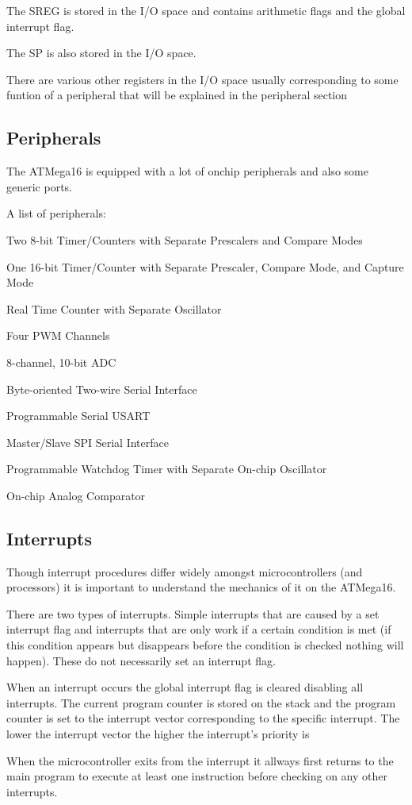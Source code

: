 The \ac{SREG} is stored in the I/O space and contains arithmetic flags
and the global interrupt flag.

The \ac{SP} is also stored in the I/O space.

There are various other registers in the I/O space usually corresponding
to some funtion of a peripheral that will be explained in the peripheral
section

\subsection{Peripherals}

The ATMega16 is equipped with a lot of onchip peripherals and also some
generic ports.

A list of peripherals:
\begin{description}
\item{Two 8-bit Timer/Counters with Separate Prescalers and Compare Modes} 
\item{One 16-bit Timer/Counter with Separate Prescaler, Compare Mode, and Capture Mode}
\item{Real Time Counter with Separate Oscillator}
\item{Four PWM Channels}
\item{8-channel, 10-bit ADC}
\item{Byte-oriented Two-wire Serial Interface}
\item{Programmable Serial USART}
\item{Master/Slave SPI Serial Interface}
\item{Programmable Watchdog Timer with Separate On-chip Oscillator}
\item{On-chip Analog Comparator}
\end{description}

\subsection{Interrupts}

Though interrupt procedures differ widely amongst microcontrollers (and processors)
it is important to understand the mechanics of it on the ATMega16. 

There are two types of interrupts. Simple interrupts that are caused by a set 
interrupt flag and interrupts that are only work if a certain condition is met 
(if this condition appears but disappears before the condition is checked nothing 
will happen). These do not necessarily set an interrupt flag.

When an interrupt occurs the global interrupt flag is cleared disabling all 
interrupts. The current program counter is stored on the stack and the 
program counter is set to the interrupt vector corresponding to the specific 
interrupt. The lower the interrupt vector the higher the interrupt's priority is

When the microcontroller exits from the interrupt it allways first returns to the
main program to execute at least one instruction before checking on any other
interrupts.
